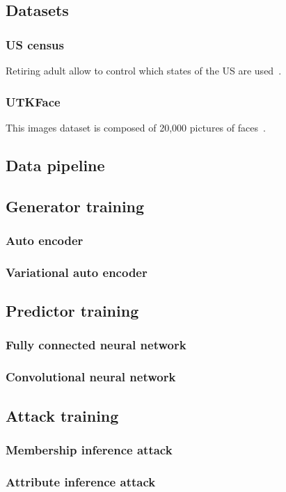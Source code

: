 \subsection{Datasets}
\subsubsection{US census}
Retiring adult allow to control which states of the US are used~\cite{ding2021retiring}.

\subsubsection{UTKFace}
This images dataset is composed of 20,000 pictures of faces~\cite{zhifei2017cvpr}.

\subsection{Data pipeline}




\subsection{Generator training}
\subsubsection{Auto encoder}
\subsubsection{Variational auto encoder}

\subsection{Predictor training}
\subsubsection{Fully connected neural network}
\subsubsection{Convolutional neural network}

\subsection{Attack training}
\subsubsection{Membership inference attack}
\subsubsection{Attribute inference attack}
